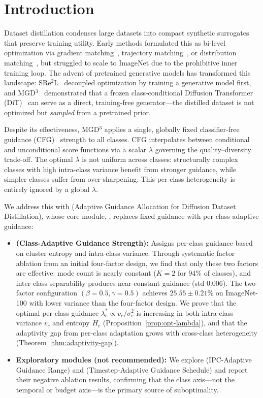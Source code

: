 \section{Introduction}
\label{sec:introduction}

Dataset distillation condenses large datasets into compact synthetic surrogates that preserve training utility. Early methods formulated this as bi-level optimization via gradient matching~\cite{zhao2023improved}, trajectory matching~\cite{cazenavette2022dataset}, or distribution matching~\cite{liu2023dream}, but struggled to scale to ImageNet due to the prohibitive inner training loop. The advent of pretrained generative models has transformed this landscape: SRe$^2$L~\cite{yin2023squeeze} decoupled optimization by training a generative model first, and MGD$^3$~\cite{chansantiago2025modeguided} demonstrated that a frozen class-conditional Diffusion Transformer (DiT)~\cite{peebles2022scalable} can serve as a direct, training-free generator---the distilled dataset is not optimized but \emph{sampled} from a pretrained prior.

Despite its effectiveness, MGD$^3$ applies a single, globally fixed classifier-free guidance (CFG)~\cite{ho2022classifierfree} strength to all classes. CFG interpolates between conditional and unconditional score functions via a scalar $\lambda$ governing the quality--diversity trade-off. The optimal $\lambda$ is not uniform across classes: structurally complex classes with high intra-class variance benefit from stronger guidance, while simpler classes suffer from over-sharpening. This per-class heterogeneity is entirely ignored by a global $\lambda$.

We address this with \ags{} (Adaptive Guidance Allocation for Diffusion Dataset Distillation), whose core module, \cags{}, replaces fixed guidance with per-class adaptive guidance:

\begin{itemize}
    \item \textbf{\cags{} (Class-Adaptive Guidance Strength):} Assigns per-class guidance based on cluster entropy and intra-class variance. Through systematic factor ablation from an initial four-factor design, we find that only these two factors are effective: mode count is nearly constant ($K{=}2$ for 94\% of classes), and inter-class separability produces near-constant guidance (std $0.006$). The two-factor configuration $(\beta{=}0.5, \gamma{=}0.5)$ achieves $25.55 \pm 0.21\%$ on ImageNet-100 with lower variance than the four-factor design. We prove that the optimal per-class guidance $\lambda_c^* \propto v_c / \sigma_c^2$ is increasing in both intra-class variance $v_c$ and entropy $H_c$ (Proposition~\ref{prop:opt-lambda}), and that the adaptivity gap from per-class adaptation grows with cross-class heterogeneity (Theorem~\ref{thm:adaptivity-gap}).
    \item \textbf{Exploratory modules (not recommended):} We explore \iast{} (IPC-Adaptive Guidance Range) and \tags{} (Timestep-Adaptive Guidance Schedule) and report their negative ablation results, confirming that the class axis---not the temporal or budget axis---is the primary source of suboptimality.
\end{itemize}


